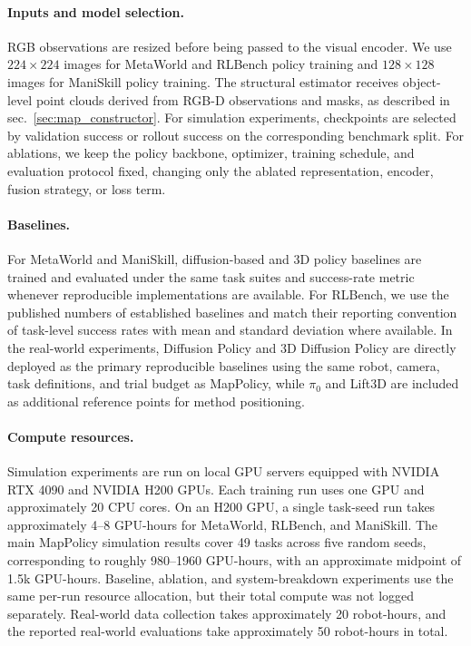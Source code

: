 \paragraph{Inputs and model selection.}
RGB observations are resized before being passed to the visual encoder. We use $224\times224$ images for MetaWorld and RLBench policy training and $128\times128$ images for ManiSkill policy training. The structural estimator receives object-level point clouds derived from RGB-D observations and masks, as described in sec.~\ref{sec:map_constructor}. For simulation experiments, checkpoints are selected by validation success or rollout success on the corresponding benchmark split. For ablations, we keep the policy backbone, optimizer, training schedule, and evaluation protocol fixed, changing only the ablated representation, encoder, fusion strategy, or loss term.

\paragraph{Baselines.}
For MetaWorld and ManiSkill, diffusion-based and 3D policy baselines are trained and evaluated under the same task suites and success-rate metric whenever reproducible implementations are available. For RLBench, we use the published numbers of established baselines and match their reporting convention of task-level success rates with mean and standard deviation where available. In the real-world experiments, Diffusion Policy and 3D Diffusion Policy are directly deployed as the primary reproducible baselines using the same robot, camera, task definitions, and trial budget as MapPolicy, while $\pi_0$ and Lift3D are included as additional reference points for method positioning.

\paragraph{Compute resources.}
Simulation experiments are run on local GPU servers equipped with NVIDIA RTX 4090 and NVIDIA H200 GPUs. Each training run uses one GPU and approximately 20 CPU cores. On an H200 GPU, a single task-seed run takes approximately 4--8 GPU-hours for MetaWorld, RLBench, and ManiSkill. The main MapPolicy simulation results cover 49 tasks across five random seeds, corresponding to roughly 980--1960 GPU-hours, with an approximate midpoint of 1.5k GPU-hours. Baseline, ablation, and system-breakdown experiments use the same per-run resource allocation, but their total compute was not logged separately. Real-world data collection takes approximately 20 robot-hours, and the reported real-world evaluations take approximately 50 robot-hours in total.

